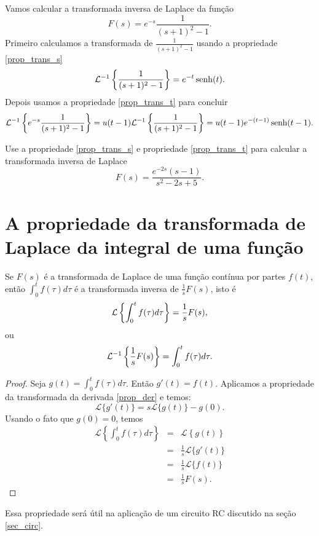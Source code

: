 \begin{ex} Vamos calcular a transformada inversa de Laplace da função
$$
F(s)=e^{-s}\frac{1}{(s+1)^2-1}.
$$
Primeiro calculamos a transformada de $\frac{1}{(s+1)^2-1}$ usando a propriedade \ref{prop_trans_s}
$$
\mathcal{L}^{-1}\left\{\frac{1}{(s+1)^2-1}\right\}=e^{-t}\operatorname{senh}(t).
$$
Depois usamos a propriedade \ref{prop_trans_t} para concluir
$$
\mathcal{L}^{-1}\left\{e^{-s}\frac{1}{(s+1)^2-1}\right\}=u(t-1)\mathcal{L}^{-1}\left\{\frac{1}{(s+1)^2-1}\right\}=u(t-1)e^{-(t-1)}\operatorname{senh}(t-1).
$$

\end{ex}
\begin{prob}Use a propriedade \ref{prop_trans_s} e propriedade \ref{prop_trans_t} para calcular a transformada inversa de Laplace
$$
F(s)=\frac{e^{-2s}(s-1)}{s^2 -2s+5}.
$$
\end{prob}

\section{A propriedade da transformada de Laplace da integral de uma função}
\begin{propr}{\label{prop_trans_int}}Se $F(s)$ é a transformada de Laplace de uma função contínua por partes $f(t)$, então $\int_0^tf(\tau)d\tau$ é a transformada inversa de $\frac{1}{s}F(s)$, isto é
\begin{equation}{\label{eq_trans_int}}
\mathcal{L}\left\{\int_0^tf(\tau)d\tau\right\} =\frac{1}{s}F(s),
\end{equation}
ou
\begin{equation}{\label{eq_trans_int_inv}}
\mathcal{L}^{-1} \left\{\frac{1}{s}F(s)\right\} =\int_0^tf(\tau)d\tau.
\end{equation} 
\end{propr}
\begin{proof}Seja $g(t)=\int_0^tf(\tau)d\tau$. Então $g'(t)=f(t)$. Aplicamos a propriedade da transformada da derivada \ref{prop_der} e temos:
$$
\mathcal{L}\{g'(t)\}=s\mathcal{L}\{g(t)\}-g(0).
$$
Usando o fato que $g(0)=0$, temos
\begin{eqnarray*}
\mathcal{L}\left\{\int_0^tf(\tau)d\tau\right\}&=&\mathcal{L}\left\{g(t)\right\}\\
&=&\frac{1}{s}\mathcal{L}\{g'(t)\}\\
&=&\frac{1}{s}\mathcal{L}\{f(t)\}\\
&=&\frac{1}{s}F(s).
\end{eqnarray*}
\end{proof}
Essa propriedade será útil na aplicação de um circuito RC discutido na seção \ref{sec_circ}.

